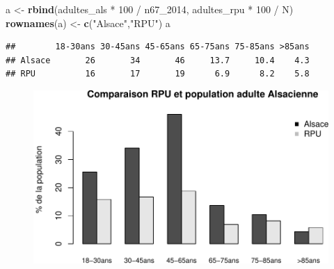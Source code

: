 \documentclass[]{article}
\newenvironment{Shaded}{\begin{snugshade}}{\end{snugshade}}
\newcommand{\KeywordTok}[1]{\textcolor[rgb]{0.13,0.29,0.53}{\textbf{{#1}}}}
\newcommand{\DataTypeTok}[1]{\textcolor[rgb]{0.13,0.29,0.53}{{#1}}}
\newcommand{\DecValTok}[1]{\textcolor[rgb]{0.00,0.00,0.81}{{#1}}}
\newcommand{\FloatTok}[1]{\textcolor[rgb]{0.00,0.00,0.81}{{#1}}}
\newcommand{\StringTok}[1]{\textcolor[rgb]{0.31,0.60,0.02}{{#1}}}
\newcommand{\OtherTok}[1]{\textcolor[rgb]{0.56,0.35,0.01}{{#1}}}
\newcommand{\NormalTok}[1]{{#1}}
\begin{document}
\begin{Shaded}
\begin{Highlighting}[]
\NormalTok{a <-}\StringTok{ }\KeywordTok{rbind}\NormalTok{(adultes_als *}\StringTok{ }\DecValTok{100} \NormalTok{/}\StringTok{ }\NormalTok{n67_2014, adultes_rpu *}\StringTok{ }\DecValTok{100} \NormalTok{/}\StringTok{ }\NormalTok{N)}
\KeywordTok{rownames}\NormalTok{(a) <-}\StringTok{ }\KeywordTok{c}\NormalTok{(}\StringTok{"Alsace"}\NormalTok{,}\StringTok{"RPU"}\NormalTok{)}
\NormalTok{a}
\end{Highlighting}
\end{Shaded}

\begin{verbatim}
##        18-30ans 30-45ans 45-65ans 65-75ans 75-85ans >85ans
## Alsace       26       34       46     13.7     10.4    4.3
## RPU          16       17       19      6.9      8.2    5.8
\end{verbatim}

\begin{Shaded}
\end{Shaded}

\begin{figure}[htbp]
\centering
\includegraphics{./age_files/figure-latex/rpu_pop-1.pdf}
\end{figure}
\end{document}
